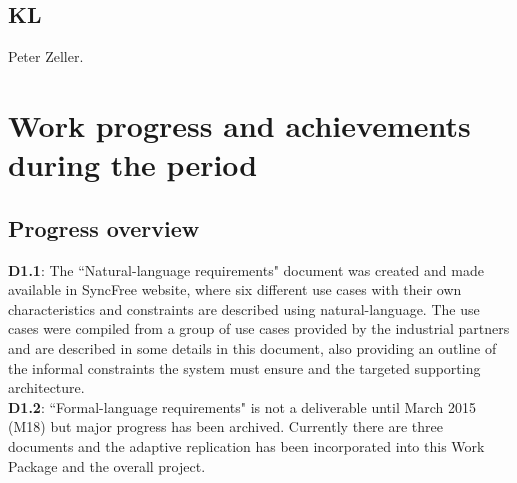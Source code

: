 \documentclass[12pt,twoside]{article}
\begin{document}
\subsection{KL}
Peter Zeller.


\newpage
\section{Work progress and achievements during the period} \label{s:DX-}

\subsection{Progress overview}


{\bf D1.1}: The ``Natural-language requirements" document was created and made available in SyncFree website, where six different use cases with their own characteristics and constraints are described using natural-language. The use cases were compiled from a group of use cases provided by the industrial partners and are described in some details in this document, also providing an outline of the informal constraints the system must ensure and the targeted supporting architecture.\\

{\bf D1.2}: ``Formal-language requirements" is not a deliverable until March 2015 (M18) but major progress has been archived. Currently there are three documents and the adaptive replication has been incorporated into this Work Package and the overall project.
\end{document}
